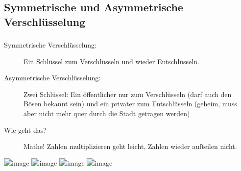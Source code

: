 \documentclass[compress]{beamer}
\begin{document}
\subsection{Symmetrische und Asymmetrische Verschlüsselung}
\begin{frame}
  \frametitle{\insertsubsection}
  \begin{overprint}
    \begin{description}
    \item[Symmetrische Verschlüsselung:] \alert{Ein} Schlüssel
      zum Verschlüsseln und wieder Entschlüsseln.
      
    \end{description}
    \begin{description}
    \item[Asymmetrische Verschlüsselung:] Zwei
      Schlüssel: Ein \alert{öffentlicher} nur zum Verschlüsseln (darf
      auch den Bösen bekannt sein) und ein \alert{privater} zum
      Entschlüsseln (geheim, muss aber nicht mehr quer durch die Stadt
      getragen werden)
    \end{description}
    \begin{description}
    \item[Wie geht das?] Mathe!  Zahlen multiplizieren geht leicht,
      Zahlen wieder aufteilen nicht.
    \end{description}
  \end{overprint}
  \vspace{1em}
  \begin{overlayarea}{\columnwidth}{8em}
    \includegraphics<2>[width=\columnwidth]{bilder/symmetric_schluessel.png}
    \includegraphics<3>[width=\columnwidth]{bilder/symmetric_text.png}
    \includegraphics<6>[width=\columnwidth]{bilder/public_key_verfahren_schluessel.png}
    \includegraphics<7>[width=\columnwidth]{bilder/public_key_verfahren_text.png}
  \end{overlayarea}

\end{frame}
\end{document}
